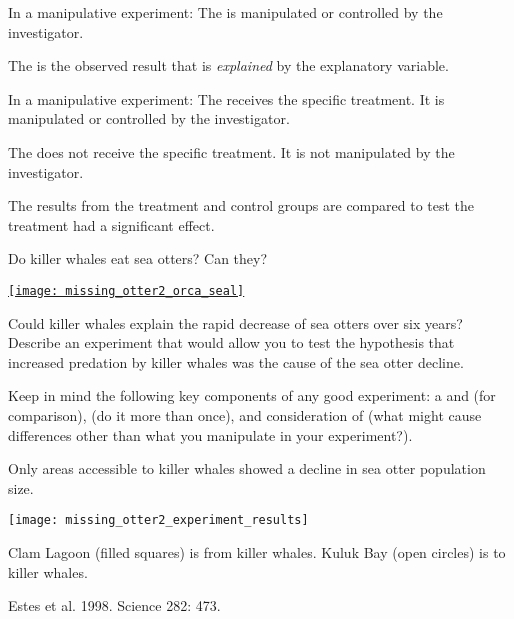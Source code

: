 \documentclass[t]{beamer}
\begin{document}
%
\begin{frame}[t]{In a manipulative experiment:}
	\hangpara The  is manipulated or controlled by the investigator.
	
	\hangpara The  is the observed result that is \emph{explained} by the explanatory variable.
\end{frame}
%
\begin{frame}[t]{In a manipulative experiment:}
	\hangpara The  receives the specific treatment. It is manipulated or controlled by the investigator.
	
	\hangpara The  does not receive the specific treatment. It is not manipulated by the investigator.
	
	\hangpara The results from the treatment and control groups are compared to test the treatment had a significant effect.

\end{frame}
%
\begin{frame}[t]{Do killer whales eat sea otters? Can they?}

	\href{https://www.youtube.com/watch?v=AtF3FPyRVIw}{\texttt{[image: missing\_otter2\_orca\_seal]}}

\end{frame}
%
\begin{frame}[t]{Could killer whales explain the rapid decrease of sea otters over six years?}
	\hangpara Describe an experiment that would allow you to test the hypothesis that increased predation by killer whales was the cause of the sea otter decline. 
	
	\hangpara Keep in mind the following key components of any good experiment: a  and  (for comparison),  (do it more than once), and consideration of  (what might cause differences other than what you manipulate in your experiment?).

\end{frame}
%
\begin{frame}[t]{Only areas accessible to killer whales showed a decline in sea otter population size.}

\texttt{[image: missing\_otter2\_experiment\_results]}

Clam Lagoon (filled squares) is  from killer whales.\newline
Kuluk Bay (open circles) is  to killer whales.

\vfilll

\hfill \tiny Estes et al. 1998. Science 282: 473.
\end{frame}
\end{document}
